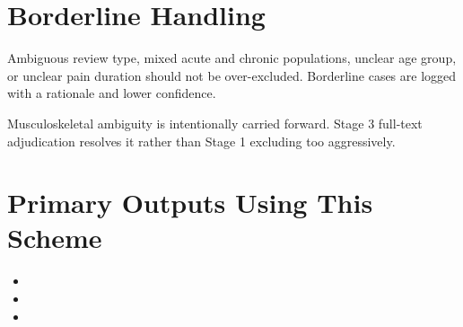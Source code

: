 \documentclass[11pt]{article}
\begin{document}
\section*{Borderline Handling}
Ambiguous review type, mixed acute and chronic populations, unclear age group, or unclear pain duration should not be over-excluded. Borderline cases are logged with a rationale and lower confidence.

Musculoskeletal ambiguity is intentionally carried forward. Stage 3 full-text adjudication resolves it rather than Stage 1 excluding too aggressively.


\section*{Primary Outputs Using This Scheme}
\begin{itemize}
\item {}
\item {}
\item {}
\end{itemize}
\end{document}
